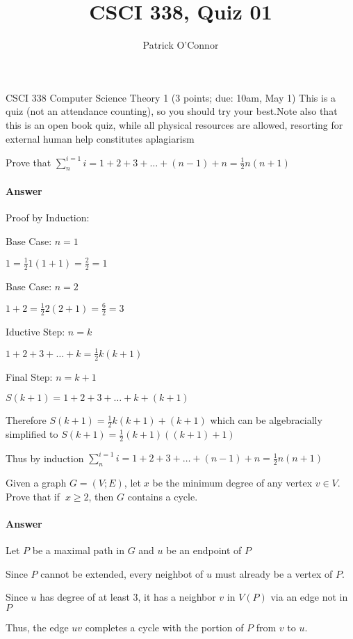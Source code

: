 \documentclass{article}
\title{CSCI 338, Quiz 01}
\author{Patrick O'Connor}
\begin{document}
\maketitle

CSCI 338 Computer Science Theory
1 (3 points; due: 10am, May 1)
This is a quiz (not an attendance counting), so you should 
try your best.Note also that this is an open book quiz, 
while all physical resources are allowed, resorting for external human 
help constitutes aplagiarism


Prove that ${\sum_{n}^{i=1}} {i=1+2+3+\ldots+(n-1)+n} = {\frac{1}{2}{n(n+1)}}$
\paragraph{Answer}
Proof by Induction:

Base Case: $n = 1$ 

$ 1 = {\frac{1}{2}{1(1+1)}} = \frac{2}{2} = 1$


Base Case: $n = 2$ 

$1+2 = {\frac{1}{2}{2(2+1)}} = \frac{6}{2} = 3$

Iductive Step: $n=k$

$1+2+3+\ldots+k = {\frac{1}{2}{k(k+1)}}$

Final Step: $n=k+1$

$S(k+1) = 1+2+3+\ldots+k+(k+1)$

Therefore $S(k+1) = {\frac{1}{2}{k(k+1)}} + (k+1)$ which can be algebracially 
simplified to 
$S(k+1) = {\frac{1}{2}{(k+1)((k+1)+1)}}$

Thus by induction ${\sum_{n}^{i=1}} {i=1+2+3+\ldots+(n-1)+n} = {\frac{1}{2}{n(n+1)}}$






Given a graph $G= (V;E)$, let$ x $ be the minimum degree of any vertex $v \in V$. 
Prove that if$ x \geq 2$, then $G$ contains a cycle.
\paragraph{Answer}
Let $P$ be a maximal path in $G$ and $u$ be an endpoint of $P$

Since $P$ cannot be extended, every neighbot of $u$ must already 
be a vertex of $P$.

Since $u$ has degree of at least 3, it has a neighbor $v$ in 
$V(P)$ via an edge not in $P$

Thus, the edge $uv$ completes a cycle with the portion of $P$ 
from $v$ to $u$.
\end{document}
